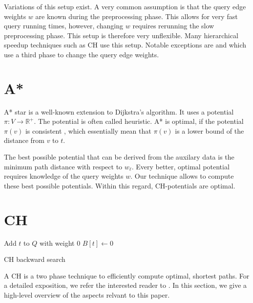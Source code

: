\documentclass[a4paper,UKenglish,cleveref, autoref]{lipics-v2019}
\begin{document}
Variations of this setup exist.
A very common assumption is that the query edge weights $w$ are known during the preprocessing phase.
This allows for very fast query running times, however, changing $w$ requires rerunning the slow preprocessing phase.
This setup is therefore very unflexible.
Many hierarchical speedup techniques such as CH use this setup.
Notable exceptions are \cite{MLD,CRP} and \cite{CCH} which use a third phase to change the query edge weights.

\section{A*}

A* star is a well-known extension to Dijkstra's algorithm.
It uses a potential $\pi:V\rightarrow \mathbb{R}^+$.
The potential is often called heuristic.
A* is optimal, if the potential $\pi(v)$ is consistent \cite{Pearl, Judea (1984). Heuristics: Intelligent Search Strategies for Computer Problem Solving. Addison-Wesley. ISBN 0-201-05594-5.}, which essentially mean that $\pi(v)$ is a lower bound of the distance from $v$ to $t$.

The best possible potential that can be derived from the auxilary data is the minimum path distance with respect to $w_\ell$.
Every better, optimal potential requires knowledge of the query weights $w$.
Our technique allows to compute these best possible potentials.
Within this regard, CH-potentials are optimal.

\section{CH}

\begin{algorithm2e}
Add $t$ to $Q$ with weight 0\;
$B[t] \leftarrow 0$\;
\caption{CH backward search}
\label{algo:ch-backward}
\end{algorithm2e}

A CH is a two phase technique to efficiently compute optimal, shortest paths.
For a detailed exposition, we refer the interested reader to \cite{CCH, CH}.
In this section, we give a high-level overview of the aspects relvant to this paper.
\end{document}
